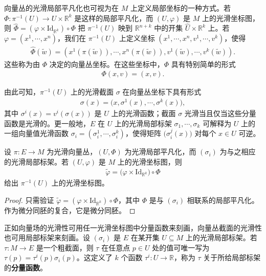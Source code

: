 \documentclass[../../main.tex]{subfiles}
\begin{document}
向量丛的光滑局部平凡化也可视为在 $M$ 上定义局部坐标的一种方式。若 $\Phi\colon\pi^{-1}(U)\to U\times\mathbb{R}^k$ 是这样的局部平凡化，而 $(U,\varphi)$ 是 $M$ 上的光滑坐标图，则 $\widehat\Phi=(\varphi\times\mathrm{Id}_{\mathbb{R}^k})\circ\Phi$ 把 $\pi^{-1}(U)$ 映到 $\mathbb{R}^{n+k}$ 中的开集 $\widehat U\times\mathbb{R}^k$ 上。若 $\varphi=(x^1,\cdots ,x^n)$，我们在 $\pi^{-1}(U)$ 上定义坐标 $(x^1,\cdots ,x^n,v^1,\cdots ,v^k)$，使得
\begin{align*}
\widehat\Phi(\tilde w)=(x^1(\pi(\tilde w)),\cdots ,x^n(\pi(\tilde w)),v^1(\tilde w),\cdots ,v^k(\tilde w)).
\end{align*}
这些称为由 $\Phi$ 决定的向量丛坐标。在这些坐标中，$\Phi$ 具有特别简单的形式
\begin{align*}
\Phi(x,v)=(x,v).
\end{align*}

由此可知，$\pi^{-1}(U)$ 上的光滑截面 $\sigma$ 在向量丛坐标下具有形式
\begin{align*}
\sigma(x)=\big(x,\sigma^1(x),\cdots ,\sigma^k(x)\big),
\end{align*}
其中 $\sigma^i(x)=v^i(\sigma(x))$ 是 $U$ 上的光滑函数；截面 $\sigma$ 光滑当且仅当这些分量函数是光滑的。更一般地，$E$ 在 $U$ 上的光滑局部标架 $\sigma_1,\cdots ,\sigma_k$ 可解释为 $U$ 上的一组向量值光滑函数 $\sigma_i=(\sigma_i^1,\cdots ,\sigma_i^k)$，使得矩阵 $\big(\sigma_i^j(x)\big)$ 对每个 $x\in U$ 可逆。
\begin{proposition}[向量丛坐标图]\label{proposition:ch10-向量丛坐标图}
设 $\pi\colon E\to M$ 为光滑向量丛，$(U,\Phi)$ 为光滑局部平凡化，而 $(\sigma_i)$ 为与之相应的光滑局部标架。若 $(U,\varphi)$ 是 $M$ 上的光滑坐标图，则
\begin{align*}
\widetilde\varphi=\big(\varphi\times\mathrm{Id}_{\mathbb{R}^k}\big)\circ\Phi
\end{align*}
给出 $\pi^{-1}(U)$ 上的光滑坐标图。
\end{proposition}

\begin{proof}
只需验证 $\widetilde\varphi=(\varphi\times\mathrm{Id}_{\mathbb{R}^k})\circ\Phi$，其中 $\Phi$ 是与 $(\sigma_i)$ 相联系的局部平凡化。作为微分同胚的复合，它是微分同胚。
\end{proof}

正如向量场的光滑性可用任一光滑坐标图中分量函数来刻画，向量丛截面的光滑性也可用局部标架来刻画。设 $(\sigma_i)$ 是 $E$ 在某开集 $U\subseteq M$ 上的光滑局部标架。若 $\tau\colon M\to E$ 是一个粗截面，则 $\tau$ 在任意点 $p\in U$ 处的值可唯一写为 $\tau(p)=\tau^i(p)\sigma_i(p)$。这定义了 $k$ 个函数 $\tau^i\colon U\to\mathbb{R}$，称为 $\tau$ 关于所给局部标架的\textbf{分量函数}。
\end{document}
